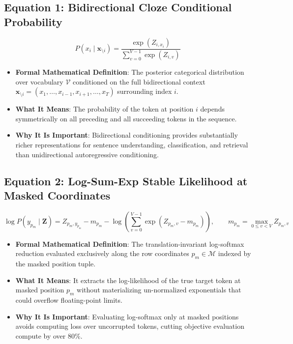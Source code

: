 \documentclass[11pt,a4paper]{article}
\theoremstyle{definition}
\begin{document}
\subsection{\textbf{Equation 1: Bidirectional Cloze Conditional Probability}}
{\boldmath
\begin{equation}
P(x_i \mid \mathbf{x}_{\setminus i}) = \frac{\exp(Z_{i, x_i})}{\sum_{v=0}^{V-1} \exp(Z_{i, v})}
\end{equation}
}
\begin{itemize}
    \item \textbf{Formal Mathematical Definition}:
    The posterior categorical distribution over vocabulary $\mathcal{V}$ conditioned on the full bidirectional context $\mathbf{x}_{\setminus i} = (x_1, \dots, x_{i-1}, x_{i+1}, \dots, x_T)$ surrounding index $i$.
    \item \textbf{What It Means}:
    The probability of the token at position $i$ depends symmetrically on all preceding and all succeeding tokens in the sequence.
    \item \textbf{Why It Is Important}:
    Bidirectional conditioning provides substantially richer representations for sentence understanding, classification, and retrieval than unidirectional autoregressive conditioning.
\end{itemize}

\subsection{\textbf{Equation 2: Log-Sum-Exp Stable Likelihood at Masked Coordinates}}
{\boldmath
\begin{equation}
\log P(y_{p_m} \mid \mathbf{Z}) = Z_{p_m, y_{p_m}} - m_{p_m} - \log\left(\sum_{v=0}^{V-1} \exp(Z_{p_m, v} - m_{p_m})\right), \qquad m_{p_m} = \max_{0 \le v < V} Z_{p_m, v}
\end{equation}
}
\begin{itemize}
    \item \textbf{Formal Mathematical Definition}:
    The translation-invariant log-softmax reduction evaluated exclusively along the row coordinates $p_m \in \mathcal{M}$ indexed by the masked position tuple.
    \item \textbf{What It Means}:
    It extracts the log-likelihood of the true target token at masked position $p_m$ without materializing un-normalized exponentials that could overflow floating-point limits.
    \item \textbf{Why It Is Important}:
    Evaluating log-softmax only at masked positions avoids computing loss over uncorrupted tokens, cutting objective evaluation compute by over 80\%.
\end{itemize}
\end{document}
